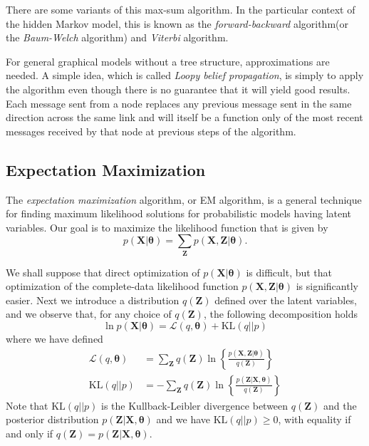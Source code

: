 \documentclass[a4paper]{report}
\newcommand{\up}{\mathrm}
\renewcommand{\bf}{\mathbf}
\renewcommand{\cal}{\mathcal}
\newcommand{\imp}[1]{{\color{blue}\textit{#1}}}
\newcommand{\bs}{\boldsymbol}
\begin{document}
There are some variants of this max-sum algorithm. In the particular context of the hidden Markov model, this is known as the \imp{forward-backward} algorithm(or the \imp{Baum-Welch} algorithm) and \imp{Viterbi} algorithm.

For general graphical models without a tree structure, approximations are needed. A simple idea, which is called \imp{Loopy belief propagation}, is simply to apply the algorithm even though there is no guarantee that it will yield good results. Each message sent from a node replaces any previous message sent in the same direction across the same link and will itself be a function only of the most recent messages received by that node at previous steps of the algorithm.
\subsection{Expectation Maximization}
The \imp{expectation maximization} algorithm, or EM algorithm, is a general technique for finding maximum likelihood solutions for probabilistic models having latent variables. Our goal is to maximize the likelihood function that is given by
\begin{equation}
	p(\bf{X}|\bs{\theta}) = \sum_{\bf{Z}} p(\bf{X,Z}|\bs{\theta}). 
\end{equation}

We shall suppose that direct optimization of $p(\bf{X}|\bs{\theta})$ is difficult, but that optimization of the complete-data likelihood function $p(\bf{X,Z}|\bs{\theta})$ is significantly easier. Next we introduce a distribution $q(\bf{Z})$ defined over the latent variables, and we observe that, for any choice of $q(\bf{Z})$, the following decomposition holds
\begin{equation}
	\ln p(\bf{X}|\bs{\theta}) = \cal{L}(q,\bs{\theta})+\up{KL}(q||p) \label{EMde}
\end{equation}
where we have defined
\begin{align}
	\cal{L}(q,\bs{\theta})&= \sum_{\bf{Z}} q(\bf{Z}) \ln \left\{ \frac{p(\bf{X,Z}|\bs{\theta})}{q(\bf{Z})} \right\}\\
	\up{KL}(q||p) &= -\sum_{\bf{Z}} q(\bf{Z}) \ln \left\{ \frac{p(\bf{Z}|\bf{X},\bs{\theta})}{q(\bf{Z})}\right\}
\end{align}
Note that $\up{KL}(q||p)$ is the Kullback-Leibler divergence between $q(\bf{Z})$ and the posterior distribution $p(\bf{Z|X},\bs{\theta})$ and we have $\up{KL}(q||p) \geq 0$, with equality if and only if $q(\bf{Z} ) = p(\bf{Z|X},\bf{\theta})$.
\end{document}
